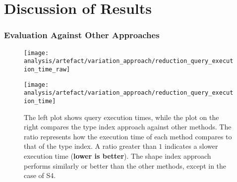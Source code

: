 \section{Discussion of Results}\label{sec:result}

\subsubsection{Evaluation Against Other Approaches}

\begin{figure}
    \centering
    \begin{minipage}[t]{0.40\linewidth}
        \centering
        \texttt{[image: analysis/artefact/variation\_approach/reduction\_query\_execution\_time\_raw]}
    \end{minipage}
    \hspace{0.05\textwidth}
    \begin{minipage}[t]{0.40\linewidth}
        \centering
        \texttt{[image: analysis/artefact/variation\_approach/reduction\_query\_execution\_time]}
    \end{minipage}

    \caption{
    The left plot shows query execution times, while the plot on the right compares the type index approach against other methods.
    The ratio represents how the execution time of each method compares to that of the type index. A ratio greater than $1$ indicates a slower execution time (\textbf{lower is better}).
    The shape index approach performs similarly or better than the other methods, except in the case of S4.
    }
    \label{fig:compApproach}
\end{figure}

%


